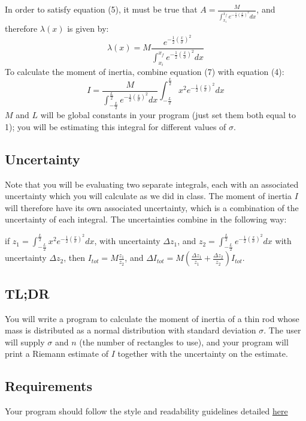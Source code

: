 \documentclass{article}
\begin{document}
In order to satisfy equation (5), it must be true that $A=\frac{M}{\int_{x_i}^{x_f}e^{-\frac{1}{2}\left(\frac{x}{\sigma}\right)^2}dx}$, and therefore $\lambda(x)$ is given by:
\begin{equation}
	\lambda(x)=M\frac{e^{-\frac{1}{2}\left(\frac{x}{\sigma}\right)^2}}{\int_{x_i}^{x_f}e^{-\frac{1}{2}\left(\frac{x}{\sigma}\right)^2}dx}
\end{equation}
To calculate the moment of inertia, combine equation (7) with equation (4):
\begin{equation}
	I=\frac{M}{\int_{-\frac{L}{2}}^{\frac{L}{2}}e^{-\frac{1}{2}\left(\frac{x}{\sigma}\right)^2}dx}\int_{-\frac{L}{2}}^{\frac{L}{2}}x^2e^{-\frac{1}{2}\left(\frac{x}{\sigma}\right)^2}dx
\end{equation}
$M$ and $L$ will be global constants in your program (just set them both equal to 1); you will be estimating this integral for different values of $\sigma$. 

\subsection*{Uncertainty}
Note that you will be evaluating two separate integrals, each with an associated uncertainty which you will calculate as we did in class. The moment of inertia $I$ will therefore have its own associated uncertainty, which is a combination of the uncertainty of each integral. The uncertainties combine in the following way:

if $z_1=\int_{-\frac{L}{2}}^{\frac{L}{2}}x^2e^{-\frac{1}{2}\left(\frac{x}{\sigma}\right)^2}dx$, with uncertainty $\Delta z_1$, and $z_2=\int_{-\frac{L}{2}}^{\frac{L}{2}}e^{-\frac{1}{2}\left(\frac{x}{\sigma}\right)^2}dx$ with uncertainty $\Delta z_2$, then $I_{tot} = M\frac{z_1}{z_2}$, and $\Delta I_{tot}=M\left(\frac{\Delta z_1}{z_1}+\frac{\Delta z_2}{z_2}\right)I_{tot}$.

\subsection*{TL;DR}
You will write a program to calculate the moment of inertia of a thin rod whose mass is distributed as a normal distribution with standard deviation $\sigma$. The user will supply $\sigma$ and $n$ (the number of rectangles to use), and your program will print a Riemann estimate of $I$ together with the uncertainty on the estimate.
\subsection*{Requirements}
Your program should follow the style and readability guidelines detailed \href{https://drive.google.com/file/d/1SFf6Rhv8LydlrUhf85QhMuiZb_IKRS4N/view?usp=sharing}{here}
\end{document}
